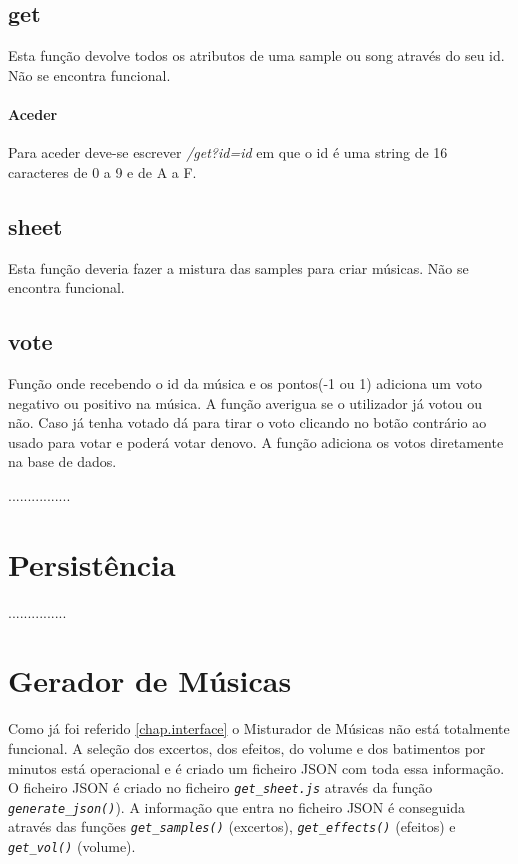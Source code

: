 \documentclass{report}
\begin{document}
 \subsection{get}
 Esta função devolve todos os atributos de uma sample ou song através do seu id.
 \p Não se encontra funcional.
 \paragraph{Aceder} 
 Para aceder deve-se escrever \textit{/get?id=id} em que o id é uma string de 16 caracteres de 0 a 9 e de A a F.

 \subsection{sheet}
 Esta função deveria fazer a mistura das samples para criar músicas.
 \p Não se encontra funcional.

 \subsection{vote}
Função onde recebendo o id da música e os pontos(-1 ou 1) adiciona 
um voto negativo ou positivo na música.
A função averigua se o utilizador já votou ou não. Caso já tenha votado
dá para tirar o voto clicando no botão contrário ao usado para votar e
poderá votar denovo.
A função adiciona os votos diretamente na base de dados.

................

\section{Persistência}
\label{chap.persistencia}
...............

\section{Gerador de Músicas}
\label{chap.gerador}
Como já foi referido \autoref{chap.interface} o Misturador de Músicas não está totalmente funcional. A seleção dos excertos, dos efeitos, do volume e dos batimentos por minutos está operacional e é criado um ficheiro JSON com toda essa informação. O ficheiro JSON é criado no ficheiro \textit{\texttt{get\_sheet.js}} através da função \textit{\texttt{generate\_json()}}). A informação que entra no ficheiro JSON é conseguida através das funções \textit{\texttt{get\_samples()}} (excertos), \textit{\texttt{get\_effects()}} (efeitos) e \textit{\texttt{get\_vol()}} (volume).
\end{document}
